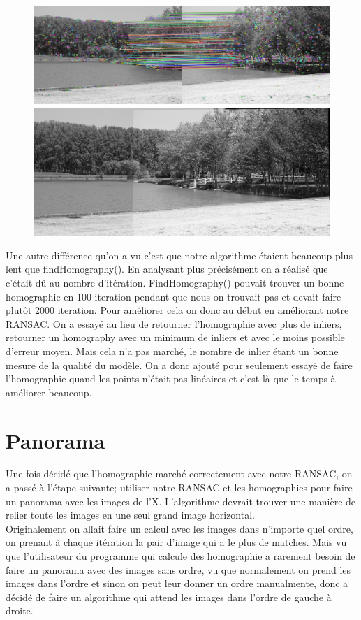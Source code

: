 \documentclass[11pt]{article}
\begin{document}
\begin{figure}[H]
\centering
\includegraphics[width=.8\textwidth]{../resources/matchers/akaze.jpg}
\includegraphics[width=.8\textwidth]{../resources/matchers/akaze_pano.jpg}
\end{figure}

Une autre différence qu’on a vu c’est que notre algorithme étaient beaucoup plus lent que findHomography(). En analysant plus précisément on a réalisé que c’était dû au nombre d'itération. FindHomography() pouvait trouver un bonne homographie en 100 iteration pendant que nous on trouvait pas et devait faire plutôt 2000 iteration. Pour améliorer cela on donc au début en améliorant notre RANSAC. On a essayé au lieu de retourner l'homographie avec plus de inliers, retourner un homography avec un minimum de inliers et avec le moins possible d'erreur moyen. Mais cela n’a pas marché, le nombre de inlier étant un bonne mesure de la qualité du modèle. On a donc ajouté pour seulement essayé de faire l’homographie quand les points n’était pas linéaires et c’est là que le temps à améliorer beaucoup.

\section{Panorama}

Une fois décidé que l’homographie marché correctement avec notre RANSAC, on a passé à l’étape suivante; utiliser notre RANSAC et les homographies pour faire un panorama avec les images de l’X. L’algorithme devrait trouver une manière de relier toute les images en une seul grand image horizontal. \\
Originalement on allait faire un calcul avec les images dans n’importe quel ordre, on prenant à chaque itération la pair d’image qui a le plus de matches. Mais vu que l’utilisateur du programme qui calcule des homographie a rarement besoin de faire un panorama avec des images sans ordre, vu que normalement on prend les images dans l’ordre et sinon on peut leur donner un ordre manualmente, donc a décidé de faire un algorithme qui attend les images dans l’ordre de gauche à droite.  
\end{document}
